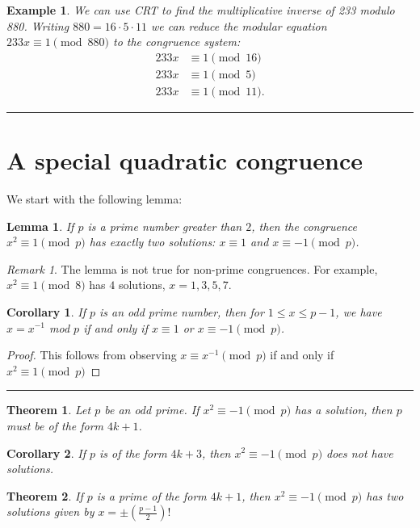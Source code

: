 \documentclass[12pt]{article}
\theoremstyle{plain}
\newtheorem{corollary}{Corollary}
\newtheorem{lemma}{Lemma}
\newtheorem{example}{Example}
\newtheorem{theorem}{Theorem}
\theoremstyle{definition}
\theoremstyle{remark}
\newtheorem{remark}{Remark}
\begin{document}
\bigskip
\begin{example}
We can use CRT to find the multiplicative inverse of 233 modulo 880. Writing $880=16\cdot 5\cdot 11$ we can reduce the modular equation $233x\equiv 1 \pmod{880}$ to the congruence system:
\begin{align*}
    233x &\equiv 1 \pmod{16} \\
    233x &\equiv 1 \pmod{5} \\
    233x &\equiv 1 \pmod{11}.
    \end{align*}
\end{example}

\bigskip
\hrule
\section{A special quadratic congruence}
We start with the following lemma:
\begin{lemma}
If $p$ is a prime number greater than $2$, then the congruence $x^2\equiv 1 \pmod{p}$ has exactly two solutions: $x\equiv 1$ and $x\equiv -1 \pmod{p}$.
\end{lemma}
\begin{remark}
The lemma is not true for non-prime congruences. For example, $x^2\equiv 1 \pmod{8}$ has $4$ solutions, $x=1, 3, 5, 7$.
\end{remark}
\begin{corollary}
If $p$ is an odd prime number, then for $1\leq x \leq p-1$, we have $x=x^{-1}$ mod $p$ if and only if $x\equiv 1$ or $x\equiv -1 \pmod{p}$.
\end{corollary}
\begin{proof}
This follows from observing $x\equiv x^{-1} \pmod{p}$ if and only if $x^2\equiv 1 \pmod{p}$
\end{proof}
\hrule



\bigskip
\begin{theorem}
Let $p$ be an odd prime. If $x^2\equiv -1 \pmod{p}$ has a solution, then $p$ must be of the form $4k+1$.
\end{theorem}

\bigskip
\begin{corollary}
If $p$ is of the form $4k+3$, then $x^2\equiv -1 \pmod{p}$ does not have solutions.
\end{corollary}

\begin{theorem}
If $p$ is a prime of the form $4k+1$, then $x^2\equiv -1 \pmod{p}$ has two solutions given by $x=\pm\left( \frac{p-1}{2}\right )!$
\end{theorem}
\end{document}
